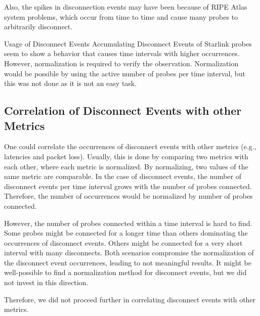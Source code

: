 Also, the spikes in disconnection events may have been because of RIPE Atlas
system problems, which occur from time to time and cause many probes to
arbitrarily disconnect.

\begin{takeaway}{Usage of Disconnect Events}
	Accumulating Disconnect Events of Starlink probes seem to show a
	behavior that causes time intervals with higher occurrences. However,
	normalization is required to verify the observation. Normalization
	would be possible by using the active number of probes per time
	interval, but this was not done as it is not an easy task.
\end{takeaway}

\subsection*{Correlation of Disconnect Events with other Metrics}
\label{sec:correlation-disconnect-events}

One could correlate the occurrences of disconnect events with other metrics
(e.g., latencies and packet loss). Usually, this is done by comparing two
metrics with each other, where each metric is normalized. By normalizing, two
values of the same metric are comparable. In the case of disconnect events, the
number of disconnect events per time interval grows with the number of probes
connected. Therefore, the number of occurrences would be normalized by number
of probes connected.

However, the number of probes connected within a time interval is hard to find.
Some probes might be connected for a longer time than others dominating the
occurrences of disconnect events. Others might be connected for a very short
interval with many disconnects. Both scenarios compromise the normalization of
the disconnect event occurrences, leading to not meaningful results. It might
be well-possible to find a normalization method for disconnect events, but we
did not invest in this direction.

Therefore, we did not proceed further in correlating disconnect events with
other metrics.
